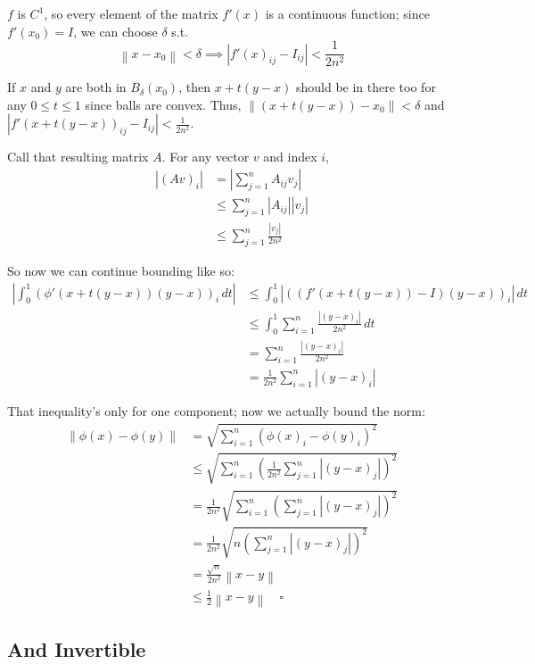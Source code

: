 \documentclass[12pt]{article}
\newcommand{\norm}[1]{\left\lVert#1\right\rVert}
\begin{document}
$f$ is $C^1$, so every element of the matrix $f'(x)$ is a continuous function;
since $f'(x_0)=I$, we can choose $\delta$ s.t.
\[\norm{x-x_0} < \delta \implies |f'(x)_{ij}-I_{ij}| < \frac{1}{2n^2}\]

If $x$ and $y$ are both in $B_\delta(x_0)$, then $x+t(y-x)$ should be in there too
for any $0 \le t \le 1$ since balls are convex.
Thus, $\norm{(x+t(y-x))-x_0} < \delta$ and $|f'(x+t(y-x))_{ij}-I_{ij}| < \frac{1}{2n^2}$.

Call that resulting matrix $A$.
For any vector $v$ and index $i$,
\begin{align*}
  |(Av)_i|
   & = \left|\sum_{j=1}^{n} A_{ij}v_j\right| \\
   & \le \sum_{j=1}^{n} |A_{ij}||v_j|        \\
   & \le \sum_{j=1}^{n} \frac{|v_j|}{2n^2}
\end{align*}

So now we can continue bounding like so:
\begin{align*}
  \left|\int_{0}^{1} (\phi'(x+t(y-x))(y-x))_i\,dt\right|
   & \le \int_{0}^{1} |((f'(x+t(y-x))-I)(y-x))_i|\,dt           \\
   & \le \int_{0}^{1} \sum_{i=1}^{n} \frac{|(y-x)_i|}{2n^2}\,dt \\
   & = \sum_{i=1}^{n} \frac{|(y-x)_i|}{2n^2}                    \\
   & = \frac{1}{2n^2} \sum_{i=1}^{n} |(y-x)_i|
\end{align*}

That inequality's only for one component; now we actually bound the norm:
\begin{align*}
  \norm{\phi(x)-\phi(y)}
   & = \sqrt{\sum_{i=1}^{n} (\phi(x)_i-\phi(y)_i)^2}                                  \\
   & \le \sqrt{\sum_{i=1}^{n} \left(\frac{1}{2n^2} \sum_{j=1}^{n} |(y-x)_j|\right)^2} \\
   & = \frac{1}{2n^2}\sqrt{\sum_{i=1}^{n} \left(\sum_{j=1}^{n} |(y-x)_j|\right)^2}    \\
   & = \frac{1}{2n^2} \sqrt{n\left(\sum_{j=1}^{n} |(y-x)_j|\right)^2}                 \\
   & = \frac{\sqrt{n}}{2n^2} \norm{x-y}                                               \\
   & \le \frac{1}{2} \norm{x-y}\quad\square
\end{align*}

\pagebreak

\subsection{And Invertible}
\end{document}
